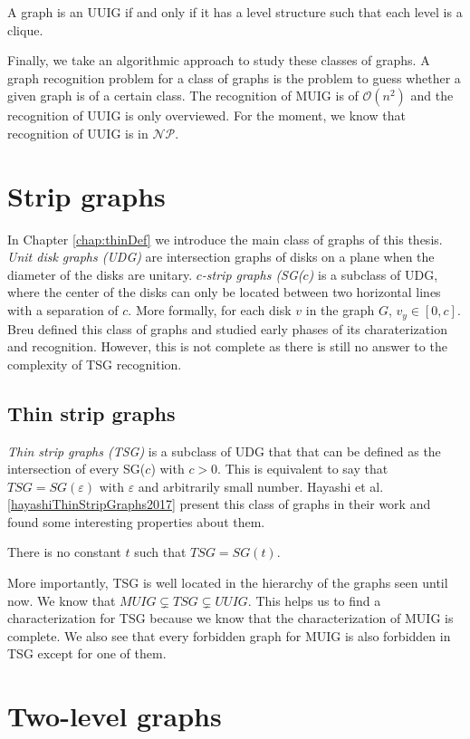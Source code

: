 \begin{_theo}
  A graph is an UUIG if and only if it has a level structure such that each level is a clique.
\end{_theo}

Finally, we take an algorithmic approach to study these classes of graphs. A graph recognition problem for a class of graphs is the problem to guess whether a given graph is of a certain class. The recognition of MUIG is of $\mathcal{O}(n^2)$ \cite{talonCompletionMixedUnit2014} and the recognition of UUIG is only overviewed. For the moment, we know that recognition of UUIG is in $\mathcal{NP}$.

\section*{Strip graphs}

In Chapter \ref{chap:thinDef} we introduce the main class of graphs of this thesis. \emph{Unit disk graphs (UDG)} are intersection graphs of disks on a plane when the diameter of the disks are unitary. \emph{$c$-strip graphs (SG($c$)} \cite{breuAlgorithmicAspectsConstrained1996} is a subclass of UDG, where the center of the disks can only be located between two horizontal lines with a separation of $c$. More formally, for each disk $v$ in the graph $G$, $v_y \in [0,c]$. Breu \cite{breuAlgorithmicAspectsConstrained1996} defined this class of graphs and studied early phases of its charaterization and recognition. However, this is not complete as there is still no answer to the complexity of TSG recognition.


\subsection*{Thin strip graphs}

\emph{Thin strip graphs (TSG)} is a subclass of UDG that that can be defined as the intersection of every SG($c$) with $c > 0$. This is equivalent to say that $TSG = SG(\varepsilon)$ with $\varepsilon$ and arbitrarily small number. Hayashi et al. \ref{hayashiThinStripGraphs2017} present this class of graphs in their work and found some interesting properties about them.

\begin{_theo}
  There is no constant $t$ such that $TSG = SG(t)$.
\end{_theo}

More importantly, TSG is well located in the hierarchy of the graphs seen until now. We know that $MUIG \subsetneq TSG \subsetneq UUIG$. This helps us to find a characterization for TSG because we know that the characterization of MUIG is complete. We also see that every forbidden graph for MUIG is also forbidden in TSG except for one of them.

\section*{Two-level graphs}
